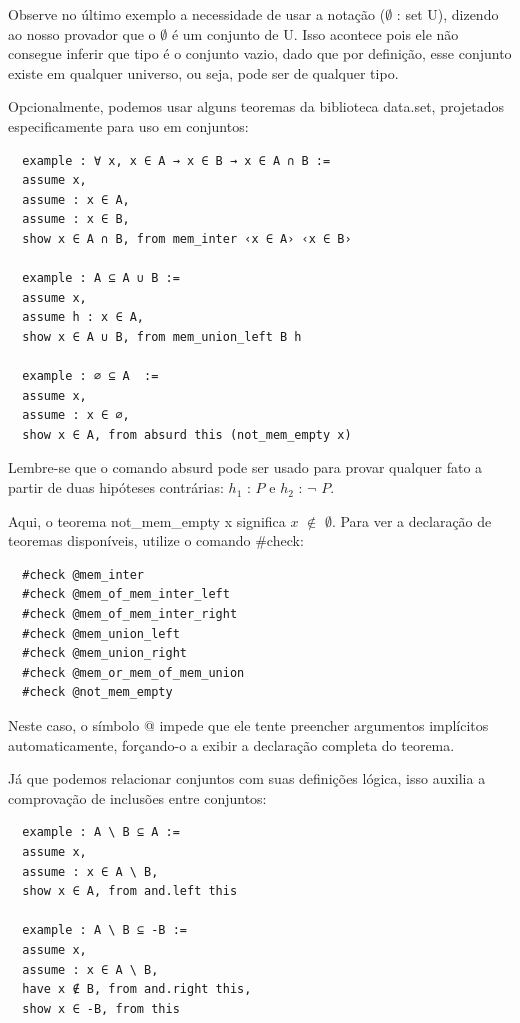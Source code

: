   Observe no último exemplo a necessidade de usar a notação { \selectfont ($\emptyset$ : set U)}, dizendo ao nosso provador que o $\emptyset$ é um conjunto de {
  \selectfont U}. Isso acontece pois ele não consegue inferir que tipo é o conjunto vazio, dado que por definição, esse conjunto existe em qualquer universo, ou seja, pode ser de qualquer tipo.

  Opcionalmente, podemos usar alguns teoremas da biblioteca {
  \selectfont data.set}, projetados especificamente para uso em conjuntos:

  \begin{lstlisting}
  example : ∀ x, x ∈ A → x ∈ B → x ∈ A ∩ B :=
  assume x,
  assume : x ∈ A,
  assume : x ∈ B,
  show x ∈ A ∩ B, from mem_inter ‹x ∈ A› ‹x ∈ B›

  example : A ⊆ A ∪ B :=
  assume x,
  assume h : x ∈ A,
  show x ∈ A ∪ B, from mem_union_left B h

  example : ∅ ⊆ A  :=
  assume x,
  assume : x ∈ ∅,
  show x ∈ A, from absurd this (not_mem_empty x) \end{lstlisting}

  Lembre-se que o comando{
  \selectfont absurd} pode ser usado para provar qualquer fato a partir de duas hipóteses contrárias: $h_1$ : $P$ e $h_2$ : $\neg$ $P$.

  Aqui, o teorema {
  \selectfont not\_mem\_empty x} significa $x$ $\notin$ $\emptyset$. Para ver a declaração de teoremas disponíveis, utilize o comando{
  \selectfont \#check}:

  \begin{lstlisting}
  #check @mem_inter
  #check @mem_of_mem_inter_left
  #check @mem_of_mem_inter_right
  #check @mem_union_left
  #check @mem_union_right
  #check @mem_or_mem_of_mem_union
  #check @not_mem_empty \end{lstlisting}

  Neste caso, o símbolo{
  \selectfont @} impede que ele tente preencher argumentos implícitos automaticamente, forçando-o a exibir a declaração completa do teorema.

  Já que podemos relacionar conjuntos com suas definições lógica, isso auxilia a comprovação de inclusões entre conjuntos:

  \begin{lstlisting}
  example : A \ B ⊆ A :=
  assume x,
  assume : x ∈ A \ B,
  show x ∈ A, from and.left this

  example : A \ B ⊆ -B :=
  assume x,
  assume : x ∈ A \ B,
  have x ∉ B, from and.right this,
  show x ∈ -B, from this \end{lstlisting}

